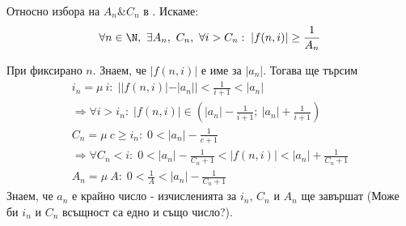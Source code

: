 \begin{remark}\label{remark:computable-sequence-computable-inverse}
    Относно избора на $A_n \& C_n$ в . Искаме:
    \begin{equation}
        \forall n\in\N,\ \exists A_n,\ C_n,\ \forall i > C_n:\; |f(n,i)| \geq \frac{1}{A_n}
    \end{equation}

    При фиксирано $n$. Знаем, че $|f(n, i)|$ е име за $|a_n|$. Тогава ще търсим
    \begin{equation}
    \begin{split}
        i_n = \mu\ i:\; ||f(n,i)| - |a_n|| < \frac{1}{i+1} < |a_n| \\
        \Rightarrow \forall i > i_n:\; |f(n, i)| \in \left( |a_n| - \frac{1}{i+1};\ |a_n| + \frac{1}{i+1} \right) \\
        C_n = \mu\ c \geq i_n:\; 0 < |a_n| - \frac{1}{c + 1}\\
        \Rightarrow \forall C_n < i:\; 0 < |a_n| - \frac{1}{C_n + 1} < |f(n, i)| < |a_n| + \frac{1}{C_n + 1} \\
        A_n = \mu\ A:\; 0 < \frac{1}{A} < |a_n| - \frac{1}{C_n + 1}
    \end{split}
    \end{equation}
    Знаем, че $a_n$ е крайно число - изчисленията за $i_n$, $C_n$ и $A_n$ ще завършат (Може би $i_n$ и $C_n$ всъщност са едно и също число?).
\end{remark}